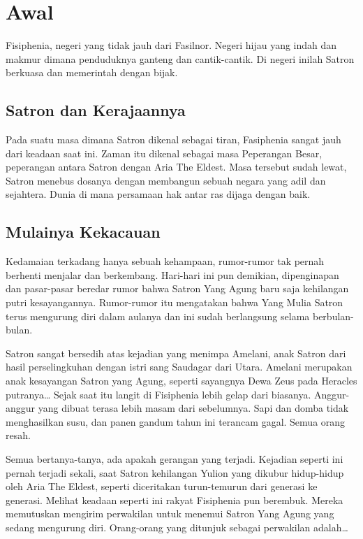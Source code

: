 %
%
% 
%

\section{Awal}
Fisiphenia, negeri yang tidak jauh dari Fasilnor. 
Negeri hijau yang indah dan makmur dimana penduduknya ganteng dan 
cantik-cantik. 
Di negeri inilah Satron berkuasa dan memerintah dengan bijak.

\subsection{Satron dan Kerajaannya}
Pada suatu masa dimana Satron dikenal sebagai tiran, Fasiphenia sangat 
jauh dari keadaan saat ini. 
Zaman itu dikenal sebagai masa Peperangan Besar, peperangan antara 
Satron dengan Aria The Eldest. 
Masa tersebut sudah lewat, Satron menebus dosanya dengan membangun 
sebuah negara yang adil dan sejahtera. 
Dunia di mana persamaan hak antar ras dijaga dengan baik. 

\subsection{Mulainya Kekacauan}
Kedamaian terkadang hanya sebuah kehampaan, rumor-rumor tak pernah 
berhenti menjalar dan berkembang. 
Hari-hari ini pun demikian, dipenginapan dan pasar-pasar beredar rumor 
bahwa Satron Yang Agung baru saja kehilangan putri kesayangannya. 
Rumor-rumor itu mengatakan bahwa Yang Mulia Satron terus mengurung 
diri dalam aulanya dan ini sudah berlangsung selama berbulan-bulan.

Satron sangat bersedih atas kejadian yang menimpa Amelani, anak Satron 
dari hasil perselingkuhan dengan istri sang Saudagar dari Utara. 
Amelani merupakan anak kesayangan Satron yang Agung, seperti sayangnya 
Dewa Zeus pada Heracles putranya\ldots
Sejak saat itu langit di Fisiphenia lebih gelap dari biasanya. 
Anggur-anggur yang dibuat terasa lebih masam dari sebelumnya. 
Sapi dan domba tidak menghasilkan susu, dan panen gandum tahun ini 
terancam gagal. 
Semua orang resah.

Semua bertanya-tanya, ada apakah gerangan yang terjadi. 
Kejadian seperti ini pernah terjadi sekali, saat Satron kehilangan 
Yulion yang dikubur hidup-hidup oleh Aria The Eldest, seperti diceritakan 
turun-temurun dari generasi ke generasi.
Melihat keadaan seperti ini rakyat Fisiphenia pun berembuk. 
Mereka memutuskan mengirim perwakilan untuk menemui Satron Yang Agung 
yang sedang mengurung diri. 
Orang-orang yang ditunjuk sebagai perwakilan adalah\ldots

